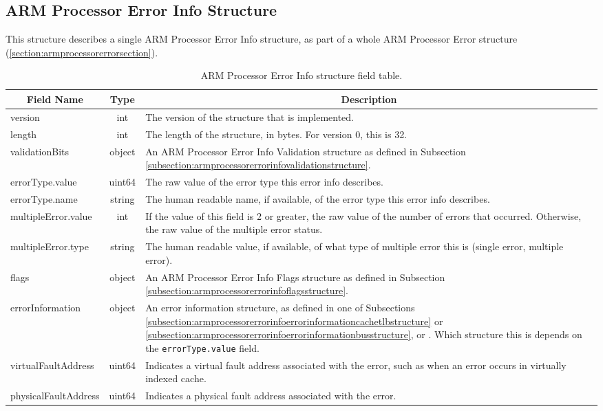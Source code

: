 \documentclass{report}
\newcommand*{\thead}[1]{\multicolumn{1}{|c|}{\bfseries #1}}
\newcommand*{\jsontable}[1]{
    \begin{table}[!ht]
    \label{#1}
    \centering
    \begin{adjustbox}{center}
    \begin{tabular}{|l|c|p{8cm}|}
    \hline
    \thead{Field Name} & \thead{Type} & \thead{Description} \\
    \hline
}
\newcommand*{\jsontableend}[1]{
    \hline
    \end{tabular}
    \end{adjustbox}
    \caption{#1}
    \label{table:#1}
    \end{table}
    \FloatBarrier
}
\begin{document}
\subsection{ARM Processor Error Info Structure}
\label{subsection:armprocessorerrorinfostructure}
This structure describes a single ARM Processor Error Info structure, as part of a whole ARM Processor Error structure (\ref{section:armprocessorerrorsection}).
\jsontable{table:armprocessorerrorinfostructure}
version & int & The version of the structure that is implemented.\\
\hline
length & int & The length of the structure, in bytes. For version 0, this is 32.\\
\hline
validationBits & object & An ARM Processor Error Info Validation structure as defined in Subsection \ref{subsection:armprocessorerrorinfovalidationstructure}.\\
\hline
errorType.value & uint64 & The raw value of the error type this error info describes.\\
errorType.name & string & The human readable name, if available, of the error type this error info describes.\\
\hline
multipleError.value & int & If the value of this field is 2 or greater, the raw value of the number of errors that occurred. Otherwise, the raw value of the multiple error status.\\
multipleError.type & string & The human readable value, if available, of what type of multiple error this is (single error, multiple error).\\
\hline
flags & object & An ARM Processor Error Info Flags structure as defined in Subsection \ref{subsection:armprocessorerrorinfoflagsstructure}.\\ 
\hline
errorInformation & object & An error information structure, as defined in one of Subsections \ref{subsection:armprocessorerrorinfoerrorinformationcachetlbstructure} or \ref{subsection:armprocessorerrorinfoerrorinformationbusstructure}, or . Which structure this is depends on the \texttt{errorType.value} field.\\
\hline
virtualFaultAddress & uint64 & Indicates a virtual fault address associated with the error, such as when an error occurs in virtually indexed cache.\\
\hline
physicalFaultAddress & uint64 & Indicates a physical fault address associated with the error.\\
\jsontableend{ARM Processor Error Info structure field table.}
\end{document}

